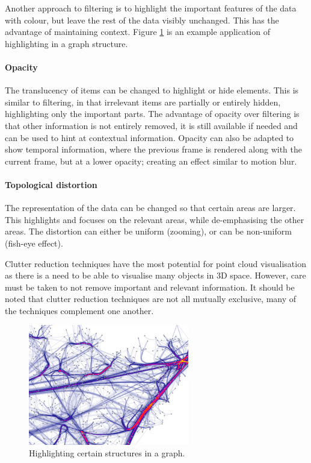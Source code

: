 Another approach to filtering is to highlight the important features of the
data with colour, but leave the rest of the data visibly unchanged. This has
the advantage of maintaining context. Figure \ref{fig:background_highlight} is
an example application of highlighting in a graph structure.

\paragraph{Opacity} The translucency of items can be changed to highlight or
hide elements. This is similar to filtering, in that irrelevant items are
partially or entirely hidden, highlighting only the important parts. The
advantage of opacity over filtering is that other information is not entirely
removed, it is still available if needed and can be used to hint at contextual
information. Opacity can also be adapted to show temporal information, where
the previous frame is rendered along with the current frame, but at a lower
opacity; creating an effect similar to motion blur.

\paragraph{Topological distortion} The representation of the data can be
changed so that certain areas are larger.  This highlights and focuses on the
relevant areas, while de-emphasising the other areas. The distortion can either
be uniform (zooming), or can be non-uniform (fish-eye effect).

Clutter reduction techniques have the most potential for point cloud
visualisation as there is a need to be able to visualise many objects in 3D
space. However, care must be taken to not remove important and relevant
information. It should be noted that clutter reduction techniques are not all
mutually exclusive, many of the techniques complement one another.

\begin{figure}[h!]
  \begin{center}
    \includegraphics[width=70mm]{graph_highlight}
  \end{center}
  \caption{Highlighting certain structures in a graph.}
  \label{fig:background_highlight}
\end{figure}

